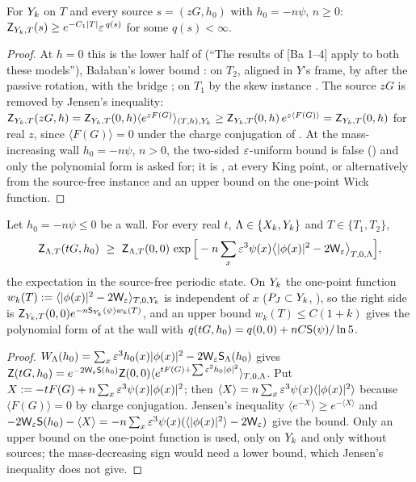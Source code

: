 \begin{proposition}\label{rot:prop:H5}
For $Y_k$ on $T$ and every source $s=(zG,h_0)$ with $h_0=-n\psi$, $n\ge0$: $\mathsf Z_{Y_k,T}(s)\ge e^{-C_1|T|}\varepsilon^{\,q(s)}$ for some $q(s)<\infty$.
\end{proposition}
\begin{proof}
At $h=0$ this is the lower half of \cite[(4.2)]{K2} (``The results of [Ba 1--4] apply to both these models''), Ba{\l}aban's lower bound \cite[(1.14)]{Ba1}: on $T_2$, aligned in $Y$'s frame, by  after the passive rotation, with the bridge ; on $T_1$ by the skew instance . The source $zG$ is removed by Jensen's inequality: $\mathsf Z_{Y_k,T}(zG,h)=\mathsf Z_{Y_k,T}(0,h)\langle e^{zF(G)}\rangle_{(T,h),Y_k}\ge\mathsf Z_{Y_k,T}(0,h)\,e^{z\langle F(G)\rangle}=\mathsf Z_{Y_k,T}(0,h)$ for real $z$, since $\langle F(G)\rangle=0$ under the charge conjugation of . At the mass-increasing wall $h_0=-n\psi$, $n>0$, the two-sided $\varepsilon$-uniform bound \cite[(4.2)]{K2} is false () and only the polynomial form is asked for; it is , at every King point, or alternatively  from the source-free instance and an upper bound on the one-point Wick function.
\end{proof}

\begin{proposition}\label{rot:prop:J}
Let $h_0=-n\psi\le0$ be a wall. For every real $t$, $\Lambda\in\{X_k,Y_k\}$ and $T\in\{T_1,T_2\}$,
\[
\Zun_{\Lambda,T}(tG,h_0)\ \ge\ \Zun_{\Lambda,T}(0,0)\,\exp\Big[-n\sum_x\eps^3\psi(x)\big\langle|\phi(x)|^2-2\sW_\eps\big\rangle_{T,0,\Lambda}\Big],
\]
the expectation in the source-free periodic state. On $Y_k$ the one-point function $w_k(T):=\langle|\phi(x)|^2-2\mathsf W_{\varepsilon}\rangle_{T,0,Y_k}$ is independent of $x$ ($P_J\subset Y_k$, ), so the right side is $\mathsf Z_{Y_k,T}(0,0)e^{-n\mathsf S_{Y_k}(\psi)w_k(T)}$, and an upper bound $w_k(T)\le C(1+k)$ gives the polynomial form of  at the wall with $q(tG,h_0)=q(0,0)+nC\mathsf S(\psi)/\ln5$.
\end{proposition}
\begin{proof}
$W_\Lambda(h_0)=\sum_x\varepsilon^3h_0(x)|\phi(x)|^2-2\mathsf W_{\varepsilon}\mathsf S_\Lambda(h_0)$ gives $\mathsf Z(tG,h_0)=e^{-2\mathsf W_{\varepsilon}\mathsf S(h_0)}\mathsf Z(0,0)\langle e^{tF(G)+\sum\varepsilon^3h_0|\phi|^2}\rangle_{T,0,\Lambda}$. Put $X:=-tF(G)+n\sum_x\varepsilon^3\psi(x)|\phi(x)|^2$; then $\langle X\rangle=n\sum_x\varepsilon^3\psi(x)\langle|\phi(x)|^2\rangle$ because $\langle F(G)\rangle=0$ by charge conjugation. Jensen's inequality $\langle e^{-X}\rangle\ge e^{-\langle X\rangle}$ and $-2\mathsf W_{\varepsilon}\mathsf S(h_0)-\langle X\rangle=-n\sum_x\varepsilon^3\psi(x)(\langle|\phi(x)|^2\rangle-2\mathsf W_{\varepsilon})$ give the bound. Only an upper bound on the one-point function is used, only on $Y_k$ and only without sources; the mass-decreasing sign would need a lower bound, which Jensen's inequality does not give.
\end{proof}

